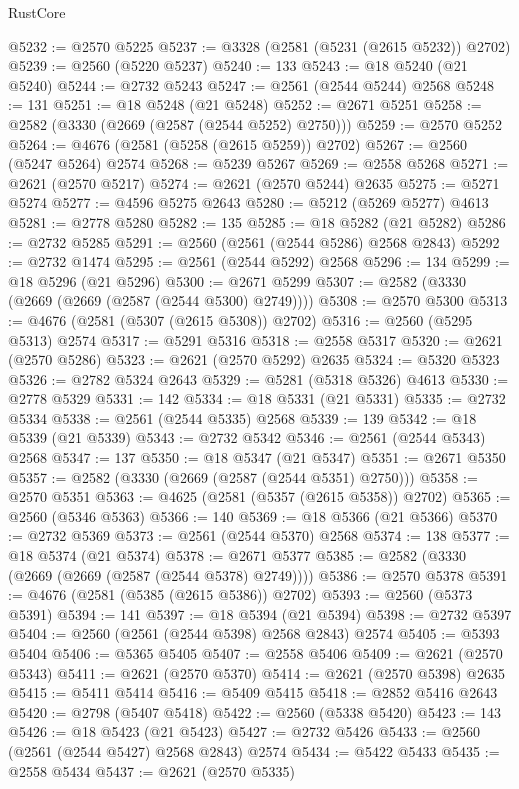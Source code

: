 \begin{lexlean}{RustCore}
\begin{coremodule}
@5232 := @2570 @5225
@5237 := @3328 (@2581 (@5231 (@2615 @5232)) @2702)
@5239 := @2560 (@5220 @5237)
@5240 := 133
@5243 := @18 @5240 (@21 @5240)
@5244 := @2732 @5243
@5247 := @2561 (@2544 @5244) @2568
@5248 := 131
@5251 := @18 @5248 (@21 @5248)
@5252 := @2671 @5251
@5258 := @2582 (@3330 (@2669 (@2587 (@2544 @5252) @2750)))
@5259 := @2570 @5252
@5264 := @4676 (@2581 (@5258 (@2615 @5259)) @2702)
@5267 := @2560 (@5247 @5264) @2574
@5268 := @5239 @5267
@5269 := @2558 @5268
@5271 := @2621 (@2570 @5217)
@5274 := @2621 (@2570 @5244) @2635
@5275 := @5271 @5274
@5277 := @4596 @5275 @2643
@5280 := @5212 (@5269 @5277) @4613
@5281 := @2778 @5280
@5282 := 135
@5285 := @18 @5282 (@21 @5282)
@5286 := @2732 @5285
@5291 := @2560 (@2561 (@2544 @5286) @2568 @2843)
@5292 := @2732 @1474
@5295 := @2561 (@2544 @5292) @2568
@5296 := 134
@5299 := @18 @5296 (@21 @5296)
@5300 := @2671 @5299
@5307 := @2582 (@3330 (@2669 (@2669 (@2587 (@2544 @5300) @2749))))
@5308 := @2570 @5300
@5313 := @4676 (@2581 (@5307 (@2615 @5308)) @2702)
@5316 := @2560 (@5295 @5313) @2574
@5317 := @5291 @5316
@5318 := @2558 @5317
@5320 := @2621 (@2570 @5286)
@5323 := @2621 (@2570 @5292) @2635
@5324 := @5320 @5323
@5326 := @2782 @5324 @2643
@5329 := @5281 (@5318 @5326) @4613
@5330 := @2778 @5329
@5331 := 142
@5334 := @18 @5331 (@21 @5331)
@5335 := @2732 @5334
@5338 := @2561 (@2544 @5335) @2568
@5339 := 139
@5342 := @18 @5339 (@21 @5339)
@5343 := @2732 @5342
@5346 := @2561 (@2544 @5343) @2568
@5347 := 137
@5350 := @18 @5347 (@21 @5347)
@5351 := @2671 @5350
@5357 := @2582 (@3330 (@2669 (@2587 (@2544 @5351) @2750)))
@5358 := @2570 @5351
@5363 := @4625 (@2581 (@5357 (@2615 @5358)) @2702)
@5365 := @2560 (@5346 @5363)
@5366 := 140
@5369 := @18 @5366 (@21 @5366)
@5370 := @2732 @5369
@5373 := @2561 (@2544 @5370) @2568
@5374 := 138
@5377 := @18 @5374 (@21 @5374)
@5378 := @2671 @5377
@5385 := @2582 (@3330 (@2669 (@2669 (@2587 (@2544 @5378) @2749))))
@5386 := @2570 @5378
@5391 := @4676 (@2581 (@5385 (@2615 @5386)) @2702)
@5393 := @2560 (@5373 @5391)
@5394 := 141
@5397 := @18 @5394 (@21 @5394)
@5398 := @2732 @5397
@5404 := @2560 (@2561 (@2544 @5398) @2568 @2843) @2574
@5405 := @5393 @5404
@5406 := @5365 @5405
@5407 := @2558 @5406
@5409 := @2621 (@2570 @5343)
@5411 := @2621 (@2570 @5370)
@5414 := @2621 (@2570 @5398) @2635
@5415 := @5411 @5414
@5416 := @5409 @5415
@5418 := @2852 @5416 @2643
@5420 := @2798 (@5407 @5418)
@5422 := @2560 (@5338 @5420)
@5423 := 143
@5426 := @18 @5423 (@21 @5423)
@5427 := @2732 @5426
@5433 := @2560 (@2561 (@2544 @5427) @2568 @2843) @2574
@5434 := @5422 @5433
@5435 := @2558 @5434
@5437 := @2621 (@2570 @5335)

\end{coremodule}
\end{lexlean}

